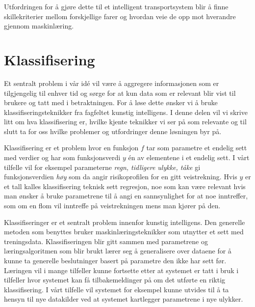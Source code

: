 \documentclass[a4paper,norsk,oneside]{book}
\begin{document}
Utfordringen for å gjøre dette til et intelligent transportsystem blir å finne skillekriterier mellom forskjellige farer og hvordan veie de opp mot hverandre gjennom maskinlæring.

\section{Klassifisering}
\label{sec:klassifisering}

Et sentralt problem i vår idé vil være å aggregere informasjonen som er tilgjengelig til enhver tid og sørge for at kun data som er relevant blir vist til brukere og tatt med i betraktningen.  For å løse dette ønsker vi å bruke klassifiseringsteknikker fra fagfeltet kunstig intelligens. I denne delen vil vi skrive litt om hva klassifisering er, hvilke kjente teknikker vi ser på som relevante og til slutt ta for oss hvilke problemer og utfordringer denne løsningen byr på.

Klassifisering er et problem hvor en funksjon $f$ tar som parametre et endelig sett med verdier og har som funksjonsverdi $y$ én av elementene i et endelig sett.\cite{norvig} I vårt tilfelle vil for eksempel parameterne \textit{regn, tidligere ulykke, tåke} gi funksjonsverdien \textit{høy} som da angir risikoprofilen for en gitt veistrekning. Hvis $y$ er et tall kalles klassifisering teknisk sett regresjon, noe som kan være relevant hvis man ønsker å bruke parametrene til å angi en sannsynlighet for at noe inntreffer, som om en flom vil inntreffe på veistrekningen mens man kjører på den.

Klassifiseringer er et sentralt problem innenfor kunstig intelligens. Den generelle metoden som benyttes bruker maskinlæringsteknikker som utnytter et sett med treningsdata. Klassifiseringen blir gitt sammen med parametrene og læringsalgoritmen som blir brukt lærer seg å generalisere over dataene for å kunne ta generelle beslutninger basert på parametre den ikke har sett før. Læringen vil i mange tilfeller kunne fortsette etter at systemet er tatt i bruk i tilfeller hvor systemet kan få tilbakemeldinger på om det utførte en riktig klassifisering. I vårt tilfelle vil systemet for eksempel kunne utvides til å ta hensyn til nye datakilder ved at systemet kartlegger parametrene i nye ulykker.	
\end{document}

